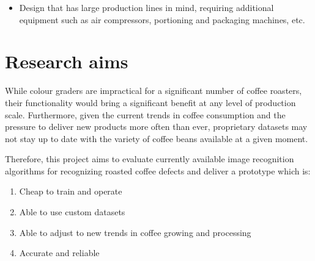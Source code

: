\begin{itemize}
	\item Design that has large production lines in mind, requiring additional equipment such as air compressors, portioning and packaging machines, etc.
\end{itemize}

\section{Research aims}
\label{sec:research-aims}
While colour graders are impractical for a significant
number of coffee roasters, their functionality would bring a significant benefit
at any level of production scale.
Furthermore, given the current trends in coffee
consumption and the pressure to deliver new products more often than ever,
proprietary datasets may not stay up to date with the variety of coffee beans available at
a given moment.

Therefore, this project aims to evaluate currently available image recognition algorithms
for recognizing roasted coffee defects and deliver a prototype which is:
\begin{enumerate}
	\item \label{itm:goal1} Cheap to train and operate

	\item \label{itm:goal2} Able to use custom datasets

	\item \label{itm:goal3} Able to adjust to new trends in coffee growing and processing

	\item \label{itm:goal4} Accurate and reliable
\end{enumerate}

